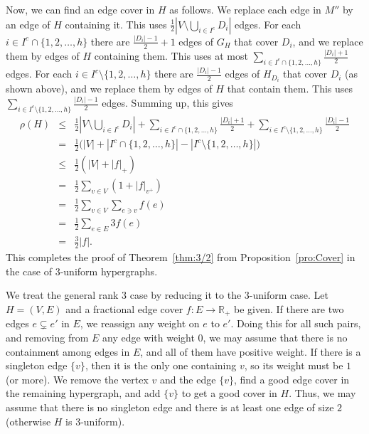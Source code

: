 \documentclass[10pt,a4paper]{amsart}
\begin{document}
Now, we can find an edge cover in $H$ as follows. We replace each edge in $M''$ by an edge of $H$ containing it. This uses $\frac{1}{2} |V \setminus \bigcup_{i \in I^c} D_i|$ edges. For each $i \in I^c \cap \{1,2, \ldots , h\}$ there are $\frac{|D_i|-1}{2} + 1$ edges of $G_H$ that cover $D_i$, and we replace them by edges of $H$ containing them. This uses at most $\sum_{i \in I^c \cap \{1,2, \ldots , h\}} \frac{|D_i|+1}{2}$ edges. For each $i \in I^c \setminus \{1,2, \ldots , h\}$ there are $\frac{|D_i|-1}{2}$ edges of $H_{D_i}$ that cover $D_i$ (as shown above), and we replace them by edges of $H$ that contain them. This uses $\sum_{i \in I^c \setminus \{1,2, \ldots , h\}} \frac{|D_i|-1}{2}$ edges. Summing up, this gives
\begin{eqnarray*}
\rho(H) & \le & \frac{1}{2} |V \setminus \bigcup _{i \in I^c} D_i| + \sum_{i \in I^c \cap \{1,2, \ldots , h\}} \frac{|D_i|+1}{2} + \sum _{i \in I^c \setminus \{1,2, \ldots , h\}} \frac{|D_i|-1}{2} \\
& = & \frac{1}{2} \bigl( |V| + |I^c \cap \{1,2, \ldots , h\}| - |I^c \setminus \{1,2, \ldots , h\}|\bigr) \\
& \le & \frac{1}{2}(|V| + |f|_+) \\
& = & \frac{1}{2} \sum_{v \in V} (1 + |f|_{v^+}) \\
& = & \frac{1}{2} \sum_{v \in V} \sum_{e \ni v} f(e) \\
& = & \frac{1}{2} \sum_{e \in E} 3f(e) \\
& = & \frac{3}{2} |f|.
\end{eqnarray*}
This completes the proof of Theorem~\ref{thm:3/2} from Proposition~\ref{pro:Cover} in the case of $3$-uniform hypergraphs.

We treat the general rank $3$ case by reducing it to the $3$-uniform case. Let $H = (V, E)$ and a fractional edge cover $f: E \to \mathbb{R}_+$ be given. If there are two edges $e \subsetneq e'$ in $E$, we reassign any weight on $e$ to $e'$. Doing this for all such pairs, and removing from $E$ any edge with weight $0$, we may assume that there is no containment among edges in $E$, and all of them have positive weight. If there is a singleton edge $\{v\}$, then it is the only one containing $v$, so its weight must be $1$ (or more). We remove the vertex $v$ and the edge $\{v\}$, find a good edge cover in the remaining hypergraph, and add $\{v\}$ to get a good cover in $H$. Thus, we may assume that there is no singleton edge and there is at least one edge of size $2$ (otherwise $H$ is $3$-uniform).
\end{document}
